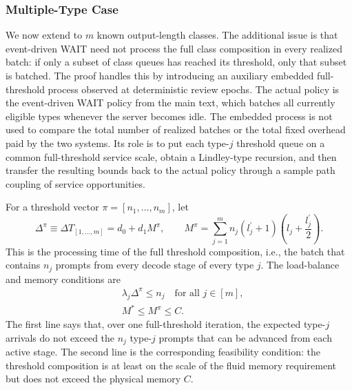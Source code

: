 \subsubsection{Multiple-Type Case}

We now extend to \(m\) known output-length classes. The additional issue is that event-driven WAIT need not process the full class composition in every realized batch: if only a subset of class queues has reached its threshold, only that subset is batched. The proof handles this by introducing an auxiliary embedded full-threshold process observed at deterministic review epochs. The actual policy is the event-driven WAIT policy from the main text, which batches all currently eligible types whenever the server becomes idle. The embedded process is not used to compare the total number of realized batches or the total fixed overhead paid by the two systems. Its role is to put each type-\(j\) threshold queue on a common full-threshold service scale, obtain a Lindley-type recursion, and then transfer the resulting bounds back to the actual policy through a sample path coupling of service opportunities.

For a threshold vector \(\pi=[n_1,\ldots,n_m]\), let
\begin{equation}\label{eq:batch_time_def}
\Delta^\pi \equiv \Delta T_{[1,\ldots,m]}
    =  d_0 + d_1 M^\pi,\qquad
M^\pi = \sum_{j=1}^m n_j(l_j^\prime+1)\left( l_j+\frac{l_j^\prime}{2} \right).
\end{equation}
This is the processing time of the full threshold composition, i.e., the batch that contains \(n_j\) prompts from every decode stage of every type \(j\). The load-balance and memory conditions are
\begin{equation}\label{eq:policy_constraints}
\begin{aligned}
&\lambda_j\Delta^\pi \leq n_j \quad \text{for all } j \in [m], \\
&M^{*}\leq M^{\pi}\leq C.
\end{aligned}
\end{equation}
The first line says that, over one full-threshold iteration, the expected type-\(j\) arrivals do not exceed the \(n_j\) type-\(j\) prompts that can be advanced from each active stage. The second line is the corresponding feasibility condition: the threshold composition is at least on the scale of the fluid memory requirement but does not exceed the physical memory \(C\).

